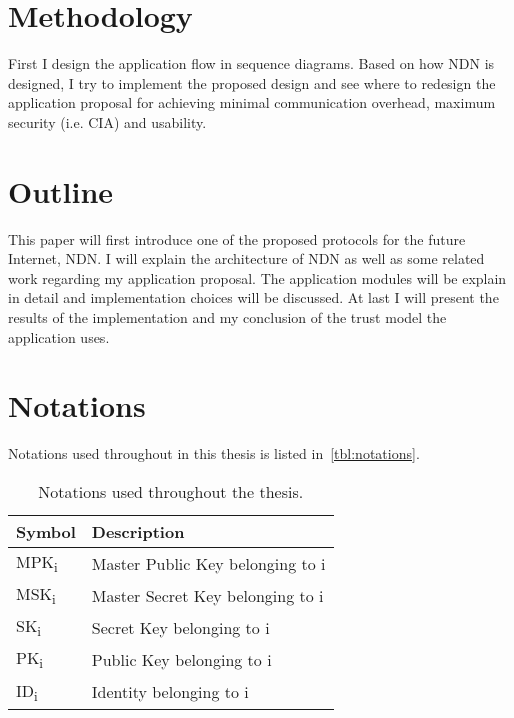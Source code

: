 \section{Methodology}

First I design the application flow in sequence diagrams.
Based on how \gls{NDN} is designed, I try to implement the proposed design and see where to redesign the application proposal for achieving minimal communication overhead, maximum security (i.e. \gls{CIA}) and usability.

\section{Outline}

This paper will first introduce one of the proposed protocols for the future Internet, \gls{NDN}.
I will explain the architecture of \gls{NDN} as well as some related work regarding my application proposal. 
The application modules will be explain in detail and implementation choices will be discussed.
At last I will present the results of the implementation and my conclusion of the trust model the application uses.

\section{Notations}
Notations used throughout in this thesis is listed in~\autoref{tbl:notations}.
\begin{table}[h]
  \begin{tabular}[c]{p{}p{}}
  \hline
  Symbol                    & Description                           \\ \hline
  MPK\textsubscript{i}      & Master Public Key belonging to i      \\ %
  MSK\textsubscript{i}      & Master Secret Key belonging to i      \\ %
  SK\textsubscript{i}       & Secret Key belonging to i             \\ %
  PK\textsubscript{i}       & Public Key belonging to i             \\ %
  ID\textsubscript{i}       & Identity belonging to i               \\ %
  \end{tabular}
  \caption{Notations used throughout the thesis.}
  \label{tbl:notations}
\end{table}